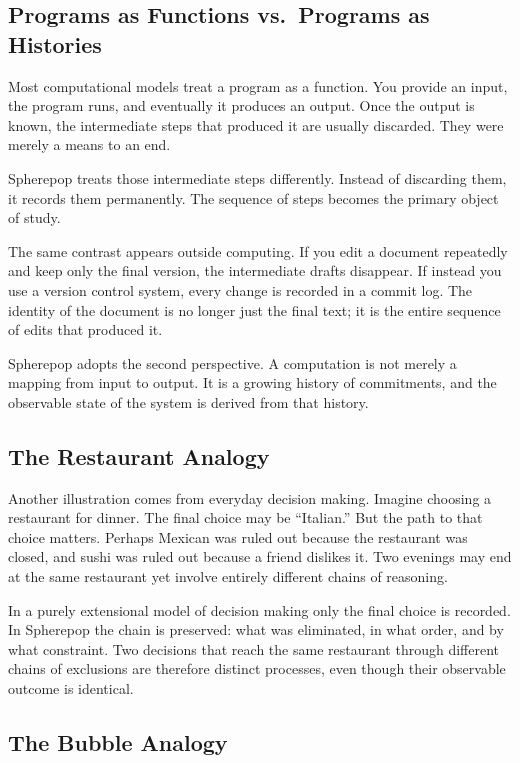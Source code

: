 \documentclass[12pt]{article}
\begin{document}
\subsection{Programs as Functions vs.\ Programs as Histories}

Most computational models treat a program as a function. You provide an input, the program runs, and eventually it produces an output. Once the output is known, the intermediate steps that produced it are usually discarded. They were merely a means to an end.

Spherepop treats those intermediate steps differently. Instead of discarding them, it records them permanently. The sequence of steps becomes the primary object of study.

The same contrast appears outside computing. If you edit a document repeatedly and keep only the final version, the intermediate drafts disappear. If instead you use a version control system, every change is recorded in a commit log. The identity of the document is no longer just the final text; it is the entire sequence of edits that produced it.

Spherepop adopts the second perspective. A computation is not merely a mapping from input to output. It is a growing history of commitments, and the observable state of the system is derived from that history.

\subsection{The Restaurant Analogy}

Another illustration comes from everyday decision making. Imagine choosing a restaurant for dinner. The final choice may be ``Italian.'' But the path to that choice matters. Perhaps Mexican was ruled out because the restaurant was closed, and sushi was ruled out because a friend dislikes it. Two evenings may end at the same restaurant yet involve entirely different chains of reasoning.

In a purely extensional model of decision making only the final choice is recorded. In Spherepop the chain is preserved: what was eliminated, in what order, and by what constraint. Two decisions that reach the same restaurant through different chains of exclusions are therefore distinct processes, even though their observable outcome is identical.

\subsection{The Bubble Analogy}
\end{document}
